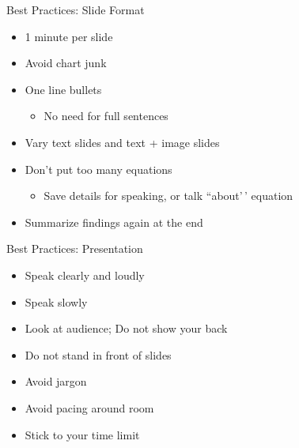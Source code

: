 \documentclass[
  ignorenonframetext,
  aspectratio=169]{beamer}
\providecommand{\tightlist}{%
  \setlength{\itemsep}{0pt}\setlength{\parskip}{0pt}}
\begin{document}
\begin{frame}{Best Practices: Slide Format}
\protect\hypertarget{best-practices-slide-format}{}
\begin{itemize}
\item
  1 minute per slide
\item
  Avoid chart junk
\item
  One line bullets

  \begin{itemize}
  \tightlist
  \item
    No need for full sentences
  \end{itemize}
\item
  Vary text slides and text + image slides
\item
  Don't put too many equations

  \begin{itemize}
  \tightlist
  \item
    Save details for speaking, or talk ``about'\,' equation
  \end{itemize}
\item
  Summarize findings again at the end
\end{itemize}
\end{frame}

\begin{frame}{Best Practices: Presentation}
\protect\hypertarget{best-practices-presentation}{}
\begin{itemize}
\item
  Speak clearly and loudly
\item
  Speak slowly
\item
  Look at audience; Do not show your back
\item
  Do not stand in front of slides
\item
  Avoid jargon
\item
  Avoid pacing around room
\item
  Stick to your time limit
\end{itemize}
\end{frame}
\end{document}
